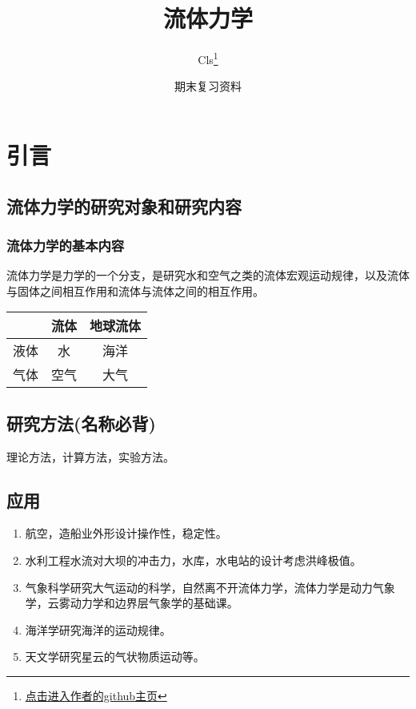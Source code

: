 \documentclass[a4paper,oneside]{ctexbook}
\title{流体力学}
\author{Cls\thanks{\href{https://github.com/Clignniis}{点击进入作者的github主页}}}
\date{期末复习资料}
\begin{document}
\frontmatter 

\maketitle

\chapter*{引言}

\section*{流体力学的研究对象和研究内容}


\subsection*{流体力学的基本内容}

流体力学是力学的一个分支，是研究水和空气之类的流体宏观运动规律，以及流体与固体之间相互作用和流体与流体之间的相互作用。
\begin{center}
    \begin{tabular}{|c|c|c|}
        \hline
        &流体 & 地球流体\\
        \hline
        液体 & 水 & 海洋\\
        \hline
        气体 & 空气 & 大气\\
        \hline
    \end{tabular}
\end{center}

\section*{研究方法(名称必背)}

理论方法，计算方法，实验方法。

\section*{应用}
\begin{enumerate}
    \item 航空，造船业外形设计操作性，稳定性。
    \item 水利工程水流对大坝的冲击力，水库，水电站的设计考虑洪峰极值。
    \item 气象科学研究大气运动的科学，自然离不开流体力学，流体力学是动力气象学，云雾动力学和边界层气象学的基础课。
    \item 海洋学研究海洋的运动规律。
    \item 天文学研究星云的气状物质运动等。
\end{enumerate} 
\end{document}

